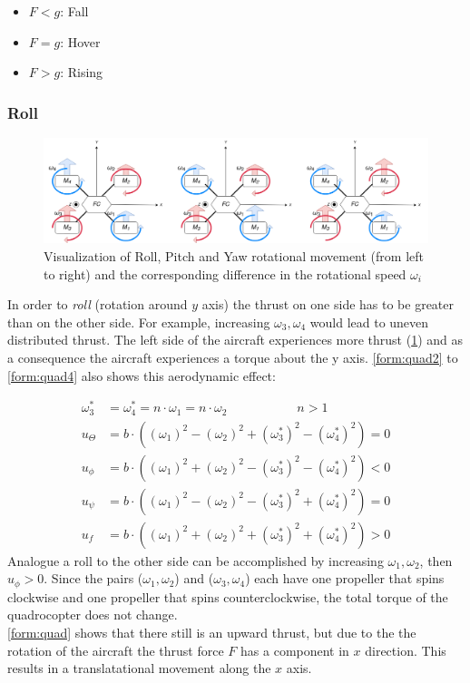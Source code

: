 \begin{itemize}
	\item $F < g$: Fall
	\item $F = g$: Hover
	\item $F > g$: Rising 
\end{itemize}

\newpage

\subsubsection{Roll}
\begin{figure}
	\centering
	\includegraphics[width=\linewidth]{figures/move.png}
	\caption{Visualization of Roll, Pitch and Yaw rotational movement (from left to right) and the corresponding difference in the rotational speed $\omega_i$}
	\label{fig:move}
\end{figure}
In order to \emph{roll} (rotation around $y$ axis) the thrust on one side has to be greater than on the other side. For example,
increasing $\omega_3, \omega_4$ would lead to uneven distributed thrust. The left side of the aircraft experiences more thrust (\cref{fig:move}) and as a consequence the aircraft experiences a torque about the y axis.
\cref{form:quad2} to \cref{form:quad4} also shows this aerodynamic effect:

\begin{align*}
	\omega_3^* &= \omega_4^* = n \cdot \omega_1 = n \cdot \omega_2 \qquad \qquad \quad \enspace  n > 1\\
	u_{\Theta} &= b \cdot ((\omega_1)^2 - (\omega_2)^2 + (\omega_3^*)^2 - (\omega_4^*)^2) = 0\\
	u_{\phi} &= b \cdot ((\omega_1)^2 + (\omega_2)^2 - (\omega_3^*)^2 - (\omega_4^*)^2) < 0 \\
	u_{\psi} &= b \cdot ((\omega_1)^2 - (\omega_2)^2 - (\omega_3^*)^2 + (\omega_4^*)^2)	= 0 \\
	u_f &= b \cdot ((\omega_1)^2 + (\omega_2)^2 + (\omega_3^*)^2 + (\omega_4^*)^2) > 0 
\end{align*}
\newline
Analogue a roll to the other side can be accomplished by increasing $\omega_1, \omega_2$, then $u_{\phi} > 0$. 
Since the pairs ($\omega_1, \omega_2$) and ($\omega_3, \omega_4$) each have one propeller that spins clockwise and one propeller that spins counterclockwise, the total torque of the quadrocopter does not change.\\
\cref{form:quad} shows that there still is an upward thrust, but due to the the rotation of the aircraft the thrust force $F$ has a component in $x$ direction. This results in a translatational movement along the $x$ axis.

